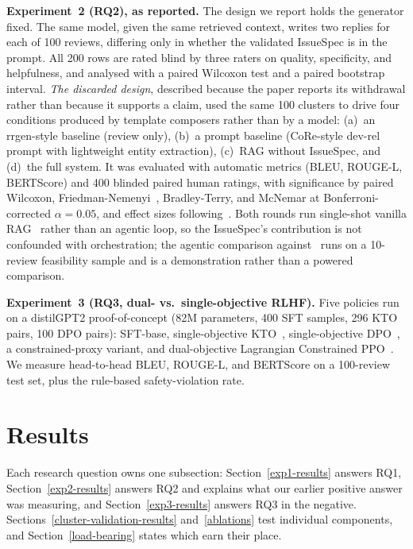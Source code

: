 \documentclass[preprint,12pt]{elsarticle}
\begin{document}
\textbf{Experiment~2 (RQ2), as reported.} The design we report holds the generator fixed. The
same model, given the same retrieved context, writes two replies for each of 100 reviews,
differing only in whether the validated IssueSpec is in the prompt. All 200 rows are rated blind
by three raters on quality, specificity, and helpfulness, and analysed with a paired Wilcoxon test
and a paired bootstrap interval. \emph{The discarded design}, described because the paper reports
its withdrawal rather than because it supports a claim, used the same 100 clusters to drive four
conditions produced by template composers rather than by a model: (a)~an rrgen-style baseline
(review only), (b)~a prompt baseline (CoRe-style dev-rel prompt with lightweight entity
extraction), (c)~RAG without IssueSpec, and (d)~the full system. It was evaluated with automatic
metrics (BLEU, ROUGE-L, BERTScore) and 400 blinded paired human ratings, with significance by
paired Wilcoxon, Friedman-Nemenyi~\cite{demvsar2006statistical}, Bradley-Terry, and McNemar at
Bonferroni-corrected $\alpha = 0.05$, and effect sizes following~\cite{romano2006appropriate,
cliff1993dominance}. Both rounds run single-shot vanilla RAG~\cite{lewis2020retrieval} rather than
an agentic loop, so the IssueSpec's contribution is not confounded with orchestration; the agentic
comparison against~\cite{asai2024self, khattab2022demonstrate} runs on a 10-review feasibility
sample and is a demonstration rather than a powered comparison.

\textbf{Experiment~3 (RQ3, dual- vs.\ single-objective RLHF).} Five policies run on a
  distilGPT2 proof-of-concept (82M parameters, 400 SFT samples, 296 KTO pairs, 100 DPO pairs):
  SFT-base, single-objective KTO~\cite{ethayarajh2024kto}, single-objective
  DPO~\cite{rafailov2023direct}, a constrained-proxy variant, and dual-objective Lagrangian
  Constrained PPO~\cite{schulman2017proximal, dai2024safe}. We measure head-to-head BLEU, ROUGE-L,
  and BERTScore on a 100-review test set, plus the rule-based safety-violation rate.
\section{Results}\label{results}

Each research question owns one subsection: Section~\ref{exp1-results} answers RQ1,
Section~\ref{exp2-results} answers RQ2 and explains what our earlier positive answer was
measuring, and Section~\ref{exp3-results} answers RQ3 in the negative.
Sections~\ref{cluster-validation-results} and~\ref{ablations} test individual components, and
Section~\ref{load-bearing} states which earn their place.
\end{document}
